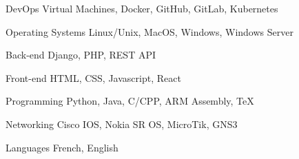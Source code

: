 

\begin{cvskills}

  \cvskill
    {DevOps} %
    {Virtual Machines, Docker, GitHub, GitLab, Kubernetes} %

  \cvskill
    {Operating Systems} %
    {Linux/Unix, MacOS, Windows, Windows Server} %

  \cvskill
    {Back-end} %
    {Django, PHP, REST API} %

  \cvskill
    {Front-end} %
    {HTML, CSS, Javascript, React} %

  \cvskill
    {Programming} %
    {Python, Java, C/CPP, ARM Assembly, TeX} %

  \cvskill
    {Networking} %
    {Cisco IOS, Nokia SR OS, MicroTik, GNS3} %

  \cvskill
    {Languages} %
    {French, English} %

\end{cvskills}
